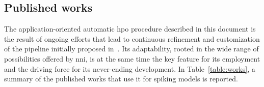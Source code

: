 \subsection{Published works}

The application-oriented automatic \gls{hpo} procedure described in this document is the result of ongoing efforts that lead to continuous refinement and customization of the pipeline initially proposed in~\cite{fra_human_2022}.
Its adaptability, rooted in the wide range of possibilities offered by \gls{nni}, is at the same time the key feature for its employment and the driving force for its never-ending development. In Table~\ref{table:works}, a summary of the published works that use it for spiking models is reported.


